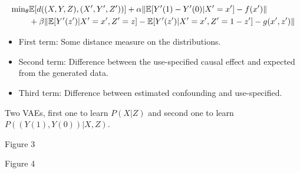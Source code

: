 \documentclass{beamer}
\DeclarePairedDelimiter\norm{\lVert}{\rVert}%
\begin{document}
\begin{frame}
	\begin{equation}
		\begin{split}
			\mathbf{\min}_{\theta} & \mathbb{E}[d((X, Y, Z), (X', Y', Z'))] + \alpha \norm{\mathbb{E}[Y'(1) - Y'(0) | X' = x'] -f(x') } \\
						& + \beta \norm{\mathbb{E}[Y'(z') | X'=x', Z'=z] - \mathbb{E}[Y'(z') | X'=x', Z'=1-z'] -g(x', z')}
		\end{split}
	\end{equation}

	\begin{itemize}
		\item First term: Some distance measure on the distributions.
		\item Second term: Difference between the use-specified causal effect and expected from the generated data.
		\item Third term: Difference between estimated confounding and use-specified.
	\end{itemize}
	Two VAEs, first one to learn $ P(X | Z) $ and second one to learn $ P((Y(1), Y(0)) | X, Z) $.
\end{frame}
\begin{frame}
Figure 3
\end{frame}
\begin{frame}
Figure 4
\end{frame}
\end{document}
